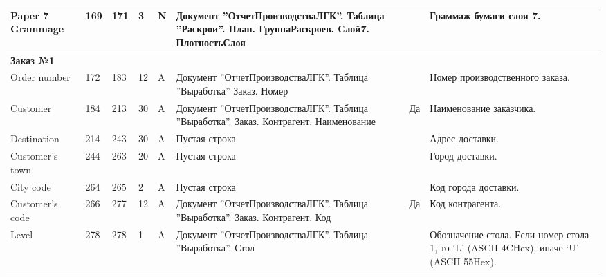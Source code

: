 \begin{landscape}
\begin{longtable}{|p{25mm}|p{6mm}|p{6mm}|p{8mm}|p{6mm}|p{60mm}|p{12mm}|p{100mm}|}
\hline
\parbox[c][20mm]{25mm}{Paper 7 Grammage} & \parbox{10mm}{169} & \parbox{10mm}{171} & \parbox{10mm}{3} & \parbox{10mm}{N} & \parbox{49mm}{Документ ''ОтчетПроизводстваЛГК''. Таблица ''Раскрои''. План. ГруппаРаскроев. Слой7. ПлотностьСлоя} & \parbox{11mm}{} & \parbox{89mm}{Граммаж бумаги слоя 7.} \\
\hline
{\bf \parbox[c][5mm]{25mm}{Заказ №1}} & \parbox{10mm}{} & \parbox{10mm}{} & \parbox{10mm}{} & \parbox{10mm}{} & \parbox{49mm}{} & \parbox{11mm}{} & \parbox{89mm}{} \\
\hline
\parbox[c][13mm]{25mm}{Order number} & \parbox{10mm}{172} & \parbox{10mm}{183} & \parbox{10mm}{12} & \parbox{10mm}{A} & \parbox{49mm}{Документ ''ОтчетПроизводстваЛГК''. Таблица ''Выработка'' Заказ. Номер} & \parbox{11mm}{} & \parbox{89mm}{Номер производственного заказа.} \\
\hline
\parbox[c][15mm]{25mm}{Customer} & \parbox{10mm}{184} & \parbox{10mm}{213} & \parbox{10mm}{30} & \parbox{10mm}{A} & \parbox{49mm}{Документ ''ОтчетПроизводстваЛГК''. Таблица ''Выработка''. Заказ. Контрагент. Наименование} & \parbox{11mm}{Да} & \parbox{89mm}{Наименование заказчика.} \\
\hline
\parbox[c][5mm]{25mm}{Destination} & \parbox{10mm}{214} & \parbox{10mm}{243} & \parbox{10mm}{30} & \parbox{10mm}{A} & \parbox{49mm}{Пустая строка} & \parbox{11mm}{} & \parbox{89mm}{Адрес доставки.} \\
\hline
\parbox[c][5mm]{25mm}{Customer's town} & \parbox{10mm}{244} & \parbox{10mm}{263} & \parbox{10mm}{20} & \parbox{10mm}{A} & \parbox{49mm}{Пустая строка} & \parbox{11mm}{} & \parbox{89mm}{Город доставки.} \\
\hline
\parbox[c][5mm]{25mm}{City code} & \parbox{10mm}{264} & \parbox{10mm}{265} & \parbox{10mm}{2} & \parbox{10mm}{A} & \parbox{49mm}{Пустая строка} & \parbox{11mm}{} & \parbox{89mm}{Код города доставки.} \\
\hline
\parbox[c][15mm]{25mm}{Customer's code} & \parbox{10mm}{266} & \parbox{10mm}{277} & \parbox{10mm}{12} & \parbox{10mm}{A} & \parbox{49mm}{Документ ''ОтчетПроизводстваЛГК''. Таблица ''Выработка''. Заказ. Контрагент. Код} & \parbox{11mm}{Да} & \parbox{89mm}{Код контрагента.} \\
\hline
\parbox[c][15mm]{25mm}{Level} & \parbox{10mm}{278} & \parbox{10mm}{278} & \parbox{10mm}{1} & \parbox{10mm}{A} & \parbox{49mm}{Документ ''ОтчетПроизводстваЛГК''. Таблица ''Выработка''. Стол} & \parbox{11mm}{} & \parbox{89mm}{Обозначение стола. Если номер стола 1, то ‘L’ (ASCII 4CHex), иначе ‘U’ (ASCII 55Hex).} \\

\end{longtable}
\end{landscape}
